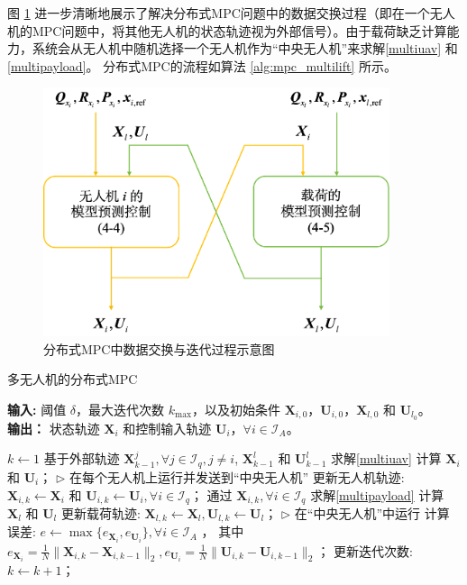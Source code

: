 \documentclass[lang=chs, degree=master, blindreview=false, winfonts=true]{yanputhesis}
\begin{document}
图 \ref{4_2} 进一步清晰地展示了解决分布式MPC问题中的数据交换过程（即在一个无人机的MPC问题中，将其他无人机的状态轨迹视为外部信号）。由于载荷缺乏计算能力，系统会从无人机中随机选择一个无人机作为“中央无人机”来求解\autoref{multiuav} 和\autoref{multipayload}。
分布式MPC的流程如算法 \ref{alg:mpc_multilift} 所示。

\begin{figure}[H]
	\centering
	\includegraphics[width=24pc]{picture/4_2.png} 
	\caption{分布式MPC中数据交换与迭代过程示意图
	} 
	\label{4_2}
\end{figure}
\begin{algorithm}[H]
    \linespread{1.2}\selectfont %
	\caption{多无人机的分布式MPC}
	\label{alg:mpc_multilift}
	\textbf{输入:} 阈值 $\delta$，最大迭代次数 $k_{\text{max}}$，以及初始条件 $\bm{X}_{i,0}$，$\bm{U}_{i,0}$，$\bm{X}_{l,0}$ 和 $\bm{U}_{l_0}$。\\
	\textbf{输出：} 状态轨迹 $\bm{X}_i$ 和控制输入轨迹 $\bm{U}_i$，$\forall i\in\mathcal{I}_{A}$。
	
	\begin{algorithmic}[1]
	\State $k \gets 1$
			\State  基于外部轨迹 $\bm{X}^j_{k-1}, \forall j \in \mathcal{I}_q, j \neq i$, $\bm{X}^l_{k-1}$ 和 $\bm{U}^l_{k-1}$ 求解\autoref{multiuav} 计算 $\bm{X}_i$ 和 $\bm{U}_i$；
			\Statex \quad \quad  $\triangleright$ 在每个无人机上运行并发送到“中央无人机”
		\EndFor
		\State 更新无人机轨迹: $\bm{X}_{i,k} \gets \bm{X}_i$ 和 $\bm{U}_{i,k} \gets \bm{U}_i, \forall i \in \mathcal{I}_q$；
		\State 通过 $\bm{X}_{i,k}, \forall i \in \mathcal{I}_q$ 求解\autoref{multipayload} 计算 $\bm{X}_l$ 和 $\bm{U}_l$
		\State 更新载荷轨迹: $\bm{X}_{l,k} \gets \bm{X}_l, \bm{U}_{l,k} \gets \bm{U}_l$；
		\Statex \quad \quad $\triangleright$ 在“中央无人机”中运行
		\State 计算误差: $e \gets \max \{ e_{\bm{X}_i}, e_{\bm{U}_i} \}, \forall i \in \mathcal{I}_A$ ，
		\Statex \quad \quad 其中 $e_{\bm{X}_i} = \frac{1}{N} \| \bm{X}_{i,k} - \bm{X}_{i,{k-1}} \|_2, e_{\bm{U}_i} = \frac{1}{N} \| \bm{U}_{i,k} - \bm{U}_{i,{k-1}} \|_2$；
		\State 更新迭代次数: $k \gets k + 1$；
	\EndWhile
	\end{algorithmic}
\end{algorithm}
\end{document}
